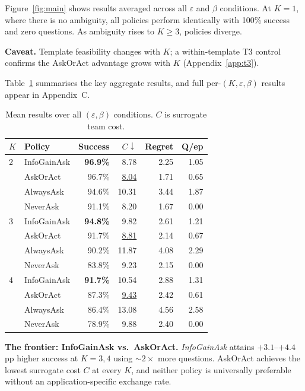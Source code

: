 \documentclass[10pt,twocolumn]{article}
\begin{document}
Figure~\ref{fig:main} shows results averaged across all $\varepsilon$ and $\beta$ conditions.
At $K{=}1$, where there is no ambiguity, all policies perform identically with 100\% success and zero questions.
As ambiguity rises to $K{\geq}3$, policies diverge.

\textbf{Caveat.} Template feasibility changes with $K$; a within-template T3 control confirms the AskOrAct advantage grows with $K$ (Appendix~\ref{app:t3}).

Table~\ref{tab:main} summarises the key aggregate results, and full per-$(K,\varepsilon,\beta)$ results appear in Appendix~C.

\begin{table}[h]
\centering
\caption{Mean results over all $(\varepsilon,\beta)$ conditions. $C$ is surrogate team cost.}
\label{tab:main}
\small
\begin{tabular}{llrrrr}
\toprule
$K$ & Policy & Success & $C\!\downarrow$ & Regret & Q/ep \\
\midrule
2 & InfoGainAsk & \textbf{96.9\%} & 8.78 & 2.25 & 1.05 \\
  & AskOrAct           & 96.7\%          & \underline{8.04} & 1.71 & 0.65 \\
  & AlwaysAsk          & 94.6\%          & 10.31 & 3.44 & 1.87 \\
  & NeverAsk           & 91.1\%          & 8.20 & 1.67 & 0.00 \\
\midrule
3 & InfoGainAsk & \textbf{94.8\%} & 9.82 & 2.61 & 1.21 \\
  & AskOrAct           & 91.7\%          & \underline{8.81} & 2.14 & 0.67 \\
  & AlwaysAsk          & 90.2\%          & 11.87 & 4.08 & 2.29 \\
  & NeverAsk           & 83.8\%          & 9.23 & 2.15 & 0.00 \\
\midrule
4 & InfoGainAsk & \textbf{91.7\%} & 10.54 & 2.88 & 1.31 \\
  & AskOrAct           & 87.3\%          & \underline{9.43} & 2.42 & 0.61 \\
  & AlwaysAsk          & 86.4\%          & 13.08 & 4.56 & 2.58 \\
  & NeverAsk           & 78.9\%          & 9.88 & 2.40 & 0.00 \\
\bottomrule
\end{tabular}
\end{table}

\textbf{The frontier: InfoGainAsk vs.\ AskOrAct.}
\textit{InfoGainAsk} attains $+3.1$--$+4.4$\,pp higher success at $K{=}3,4$ using ${\sim}2\times$ more questions.
AskOrAct achieves the lowest surrogate cost $C$ at every $K$, and neither policy is universally preferable without an application-specific exchange rate.
\end{document}
